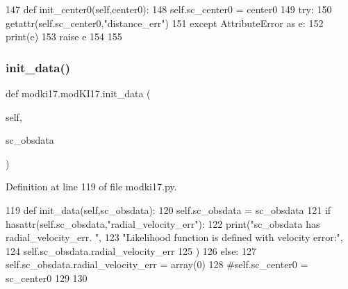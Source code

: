 \begin{DoxyCode}
147     \textcolor{keyword}{def }init\_center0(self,center0):
148         self.sc\_center0 = center0
149         \textcolor{keywordflow}{try}:
150             getattr(self.sc\_center0,\textcolor{stringliteral}{"distance\_err"})
151         \textcolor{keywordflow}{except} AttributeError \textcolor{keyword}{as} e: 
152             print(e)
153             \textcolor{keywordflow}{raise} e
154         
155 
\end{DoxyCode}
\mbox{\label{classmodki17_1_1modKI17_a3d999b9d3819a53a5d72c21458db8924}} 
\subsubsection{\texorpdfstring{init\+\_\+data()}{init\_data()}}
{\footnotesize\ttfamily def modki17.\+mod\+K\+I17.\+init\+\_\+data (\begin{DoxyParamCaption}\item[{}]{self,  }\item[{}]{sc\+\_\+obsdata }\end{DoxyParamCaption})}



Definition at line 119 of file modki17.\+py.


\begin{DoxyCode}
119     \textcolor{keyword}{def }init\_data(self,sc\_obsdata):
120         self.sc\_obsdata = sc\_obsdata
121         \textcolor{keywordflow}{if} hasattr(self.sc\_obsdata,\textcolor{stringliteral}{"radial\_velocity\_err"}):
122             print(\textcolor{stringliteral}{"sc\_obsdata has radial\_velocity\_err. "},
123                   \textcolor{stringliteral}{"Likelihood function is defined with velocity error:"},
124                   self.sc\_obsdata.radial\_velocity\_err
125                  )
126         \textcolor{keywordflow}{else}:
127             self.sc\_obsdata.radial\_velocity\_err = array(0)
128         \textcolor{comment}{#self.sc\_center0 = sc\_center0}
129     
130     
\end{DoxyCode}
\mbox{\label{classmodki17_1_1modKI17_aa46192663dc7cd3669186ab4bfbaae12}} 
